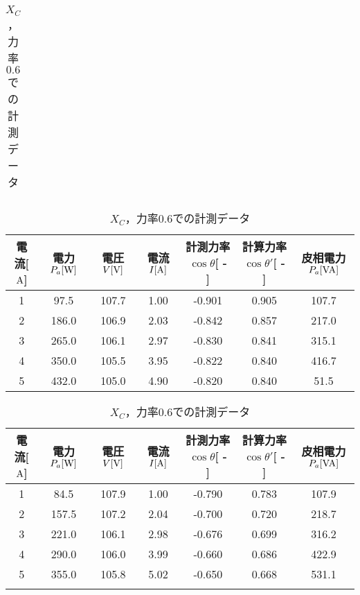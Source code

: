 \begin{table}[h]
\begin{tabular}{ccccccc}
\end{tabular}
	\caption{$X_{C}$，力率$0.8$での計測データ}
	\label{tab:0.8data2}
\begin{tabular}{ccccccc}
	\hline
	電流[$\rm{A}$] & 電力$P_a[\rm{W}]$ & 電圧$V[\rm{V}]$ & 電流$I[\rm{A}]$ & 計測力率$\cos \theta$[ - ] & 計算力率$\cos \theta '$[ - ] & 皮相電力$P_a[\rm{VA}]$ \\ \hline
	1 & 97.5  & 107.7 & 1.00 & -0.901 & 0.905 & 107.7 \\
	2 & 186.0 & 106.9 & 2.03 & -0.842 & 0.857 & 217.0 \\
	3 & 265.0 & 106.1 & 2.97 & -0.830 & 0.841 & 315.1 \\
	4 & 350.0 & 105.5 & 3.95 & -0.822 & 0.840 & 416.7 \\
	5 & 432.0 & 105.0 & 4.90 & -0.820 & 0.840 & 51.5  \\ \hline
\end{tabular}
	\caption{$X_{C}$，力率$0.6$での計測データ}
	\label{tab:0.6data2}
\begin{tabular}{ccccccc}
	\hline
	電流[$\rm{A}$] & 電力$P_a[\rm{W}]$ & 電圧$V[\rm{V}]$ & 電流$I[\rm{A}]$ & 計測力率$\cos \theta$[ - ] & 計算力率$\cos \theta '$[ - ] & 皮相電力$P_a[\rm{VA}]$ \\ \hline
	1 & 84.5  & 107.9 & 1.00 & -0.790 & 0.783 & 107.9 \\
	2 & 157.5 & 107.2 & 2.04 & -0.700 & 0.720 & 218.7 \\
	3 & 221.0 & 106.1 & 2.98 & -0.676 & 0.699 & 316.2 \\
	4 & 290.0 & 106.0 & 3.99 & -0.660 & 0.686 & 422.9 \\
	5 & 355.0 & 105.8 & 5.02 & -0.650 & 0.668 & 531.1 \\ \hline\\
\end{tabular}
\end{table}
